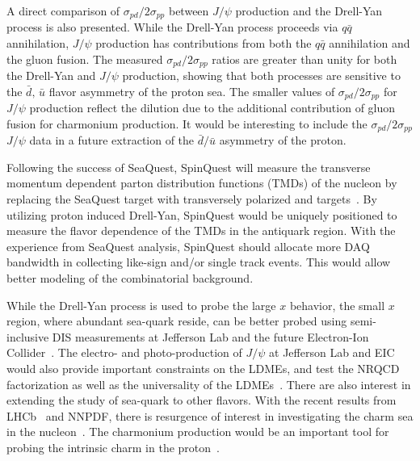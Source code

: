 \documentclass[../main.tex]{subfiles}
\begin{document}
A direct comparison of $\sigma_{pd}/2\sigma_{pp}$
between $J/\psi$ production and the Drell-Yan process is also presented. 
While the Drell-Yan process proceeds via $q \bar{q}$ annihilation,
$J/\psi$ production has contributions from both the $q \bar{q}$ annihilation and the gluon fusion.
The measured $\sigma_{pd}/2\sigma_{pp}$ ratios are greater than unity for both the Drell-Yan and $J/\psi$ production,
showing that both processes are sensitive to the $\bar{d},\,\bar{u}$ flavor asymmetry of the proton sea.
The smaller values of $\sigma_{pd}/2\sigma_{pp}$ for $J/\psi$
production reflect the dilution due to the additional contribution
of gluon fusion for charmonium production. 
It would be interesting to include the $\sigma_{pd}/2\sigma_{pp}$ $J/\psi$ data in a future
extraction of the $\bar{d}/ \bar{u}$ asymmetry of the proton. 

Following the success of SeaQuest, SpinQuest will measure the transverse momentum dependent parton distribution
functions (TMDs) of the nucleon by replacing the SeaQuest target with transversely polarized 
and  targets~\cite{geesaman2014}.
By utilizing proton induced Drell-Yan, SpinQuest would be uniquely positioned to
measure the flavor dependence of the TMDs in the antiquark region.
With the experience from SeaQuest analysis, SpinQuest should allocate more DAQ bandwidth in collecting
like-sign and/or single track events. This would allow better modeling of the combinatorial
background.

While the Drell-Yan process is used to probe the large $x$ behavior, 
the small $x$ region, where abundant sea-quark reside, can be better probed using
semi-inclusive DIS measurements at Jefferson Lab and the future Electron-Ion Collider~\cite{abdulkhalek2022}.
The electro- and photo-production of $J/\psi$ at Jefferson Lab and EIC would also provide important
constraints on the LDMEs, and test the NRQCD factorization as well as the universality of the LDMEs~\cite{qiu2021}. 
There are also interest in extending the study of sea-quark to other flavors. 
With the recent results from LHCb~\cite{aaij2022} and NNPDF\cite{ball2022},
there is resurgence of interest in investigating the charm sea in the nucleon~\cite{chang2011,chang2011a}.
The charmonium production would be an important tool for probing the intrinsic charm in the proton~\cite{vogt2021,vogt2023}.

\ifSubfilesClassLoaded{ \printbibliography[heading=bibintoc,title={References}]}{}
\end{document}
